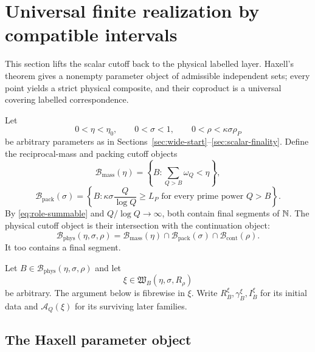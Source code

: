 \section{Universal finite realization by compatible intervals}
\label{sec:finite-realization}

This section lifts the scalar cutoff back to the physical labelled layer.  Haxell's theorem gives a nonempty parameter object of admissible independent sets; every point yields a strict physical composite, and their coproduct is a universal covering labelled correspondence.

Let
\[
0<\eta<\eta_0,
\qquad
0<\sigma<1,
\qquad
0<\rho<\kappa\sigma\rho_P
\]
be arbitrary parameters as in Sections~\ref{sec:wide-start}--\ref{sec:scalar-finality}.  Define the reciprocal-mass and packing cutoff objects
\[
\mathcal B_{\mathrm{mass}}(\eta)
=
\left\{B:\sum_{Q>B}\omega_Q<\eta\right\},
\]
\[
\mathcal B_{\mathrm{pack}}(\sigma)
=
\left\{B:
\kappa\sigma\frac Q{\log Q}\ge L_P
\text{ for every prime power }Q>B
\right\}.
\]
By \eqref{eq:role-summable} and $Q/\log Q\to\infty$, both contain final segments of $\mathbb N$.  The physical cutoff object is their intersection with the continuation object:
\begin{equation}\label{eq:global-start-cutoff}
\mathcal B_{\mathrm{phys}}(\eta,\sigma,\rho)
=
\mathcal B_{\mathrm{mass}}(\eta)
\cap
\mathcal B_{\mathrm{pack}}(\sigma)
\cap
\mathcal B_{\mathrm{cont}}(\rho).
\end{equation}
It too contains a final segment.

Let $B\in\mathcal B_{\mathrm{phys}}(\eta,\sigma,\rho)$ and let
\[
\xi\in\mathfrak W_B(\eta,\sigma,R_\rho)
\]
be arbitrary.  The argument below is fibrewise in $\xi$.  Write $R_B^\xi,\gamma_B^\xi,I_B^\xi$ for its initial data and $\mathcal A_Q(\xi)$ for its surviving later families.

\subsection{The Haxell parameter object}

